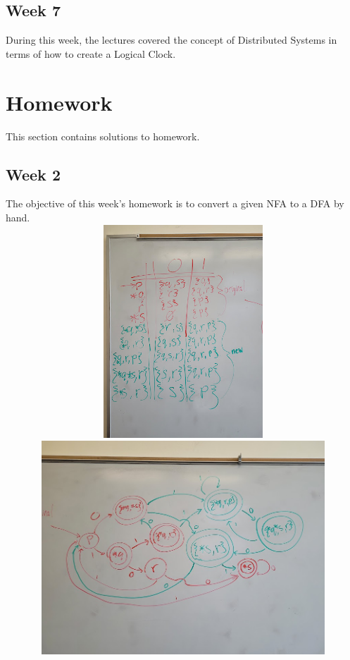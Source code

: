 \documentclass{article}
\theoremstyle{theorem}
\theoremstyle{definition}
\theoremstyle{remark}
\begin{document}
\subsection{Week 7} During this week, the lectures covered the concept of Distributed Systems in terms of how to create a Logical Clock.
\section{Homework}\label{homework}

This section contains solutions to homework. 

\subsection{Week 2}
The objective of this week's homework is to convert a given NFA to a DFA by hand.
\\ \includegraphics[width=15cm, height=8cm]{Report Images/HW2_1.jpg}
\\ \includegraphics[width=15cm, height=8cm]{Report Images/HW2_2.jpg}
\end{document}
